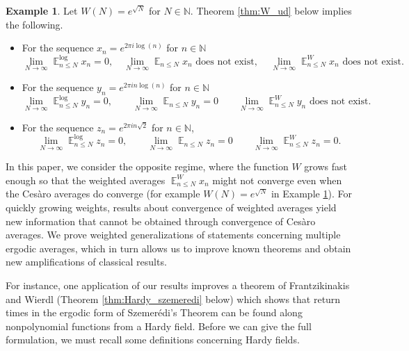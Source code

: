 \documentclass[12pt]{article}
\theoremstyle{plain} %
\theoremstyle{definition} %
\newtheorem{example}[theorem]{Example}
\theoremstyle{plain}
\theoremstyle{plain}
\numberwithin{equation}{section}
\newcommand{\Cesaro}{Ces\`{a}ro }
\newcommand{\N}{\mathbb{N}}
\renewcommand{\leq}{\leqslant}
\newcommand{\1}{\mathbbm{1}}
\newcommand{\E}{\operatorname{\mathbb{E}}}
\newcommand{\oo}{\infty}
\begin{document}
\begin{example}\label{ex:ud}
    Let $W(N) = e^{\sqrt{N}}$ for $N\in \N$. Theorem \ref{thm:W_ud} below implies the following.
    \begin{itemize}
        \item For the sequence $x_n = e^{2\pi i \log(n)}$ for $n\in \N$
        \begin{equation*}
            \lim_{N\to\oo}\E^{\log}_{n\leq N}x_n=0, \quad  
        \lim_{N\to\oo}\E_{n\leq N}x_n \text{ does not exist, }\quad  
        \lim_{N\to\oo}  \E^W_{n\leq N}x_n \text{ does not exist.}
        \end{equation*}
        \item For the sequence $y_n = e^{2\pi i n\log(n)}$ for $n\in \N$
        \begin{equation*}
            \lim_{N\to\oo}\E^{\log}_{n\leq N}y_n=0,\quad \quad  
        \lim_{N\to\oo}\E_{n\leq N}y_n=0 \quad \quad 
        \lim_{N\to\oo}  \E^W_{n\leq N}y_n \text{ does not exist.}
        \end{equation*}
        \item For the sequence $z_n = e^{2\pi  i n\sqrt{2}}$ for $n\in \N$,
        \begin{equation*}
            \lim_{N\to\oo}\E^{\log}_{n\leq N}z_n=0,\quad \quad  
        \lim_{N\to\oo}\E_{n\leq N}z_n=0 \quad \quad 
        \lim_{N\to\oo}  \E^W_{n\leq N}z_n=0 .
        \end{equation*}
    \end{itemize}
\end{example}

In this paper, we consider the opposite regime, where the function $W$ grows fast enough so that the weighted averages $\E_{n\leq N}^Wx_n$ might not converge even when the \Cesaro averages do converge (for example $W(N) = e^{\sqrt{N}}$ in Example \ref{ex:ud}). For quickly growing weights, results about convergence of weighted averages yield new information that cannot be obtained through convergence of \Cesaro averages. We prove weighted generalizations of statements concerning  multiple ergodic averages, which in turn allows us to improve known theorems and obtain new amplifications of classical results.

For instance, one application of our results improves a theorem of Frantzikinakis and Wierdl (Theorem \ref{thm:Hardy_szemeredi} below) which shows that return times in the ergodic form of Szemer\'{e}di's Theorem can be found along nonpolynomial functions from a Hardy field. Before we can give the full formulation, we must recall some definitions concerning Hardy fields.
\end{document}
